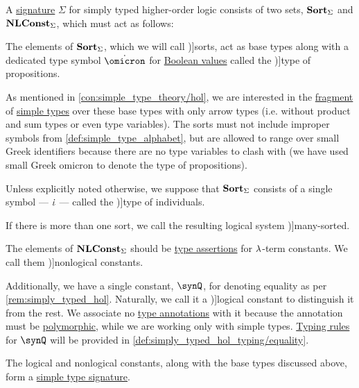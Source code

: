 \begin{definition}\label{def:simply_typed_hol_signature}\mimprovised
  A \hyperref[con:improper_symbol]{signature} \( \Sigma \) for simply typed higher-order logic consists of two  sets, \( \op*{Sort}_\Sigma \) and \( \op*{NLConst}_\Sigma \), which must act as follows:
  \begin{thmenum}
     The elements of \( \op*{Sort}_\Sigma \), which we will call \term[en=sorts (\cite[35]{BaaderNipkow2012TermRewriting})]{sorts}, act as base types along with a dedicated type symbol \( \syn\omicron \) for \hyperref[con:boolean_value]{Boolean values} called the \term[en=type of propositions (\cite[56]{Church1940STT})]{type of propositions}.

    As mentioned in \cref{con:simple_type_theory/hol}, we are interested in the \hyperref[con:syntax_fragment]{fragment} of \hyperref[def:simple_type]{simple types} over these base types with only arrow types (i.e. without product and sum types or even type variables). The sorts must not include improper symbols from \cref{def:simple_type_alphabet}, but are allowed to range over small Greek identifiers because there are no type variables to clash with (we have used small Greek omicron to denote the type of propositions).

    Unless explicitly noted otherwise, we suppose that \( \op*{Sort}_\Sigma \) consists of a single symbol --- \( \dot{\iota} \) --- called the \term[en=type of individuals (\cite[56]{Church1940STT})]{type of individuals}.

    If there is more than one sort, we call the resulting logical system \term[en=many-sorted predicate logic (\cite[\S 4.4.13]{TroelstraSchwichtenberg2000BasicProofTheory})]{many-sorted}.

     The elements of \( \op*{NLConst}_\Sigma \) should be \hyperref[def:type_assertion]{type assertions} for  \( {\mathrm \lambda} \)-term constants. We call them \term[en=nonlogical constants (\cite[211]{Andrews2002Logic})]{nonlogical constants}.

    Additionally, we have a single constant, \( \synQ \), for denoting equality as per \cref{rem:simply_typed_hol}. Naturally, we call it a \term[en=logical constants (\cite[211]{Andrews2002Logic})]{logical constant} to distinguish it from the rest. We associate no \hyperref[con:type_annotation]{type annotations} with it because the annotation must be \hyperref[def:polymorphic_typed_lambda_calculus]{polymorphic}, while we are working only with simple types. \hyperref[con:typing_rule]{Typing rules} for \( \synQ \) will be provided in \cref{def:simply_typed_hol_typing/equality}.

    The logical and nonlogical constants, along with the base types discussed above, form a \hyperref[def:simple_type_signature]{simple type signature}.
  \end{thmenum}
\end{definition}
